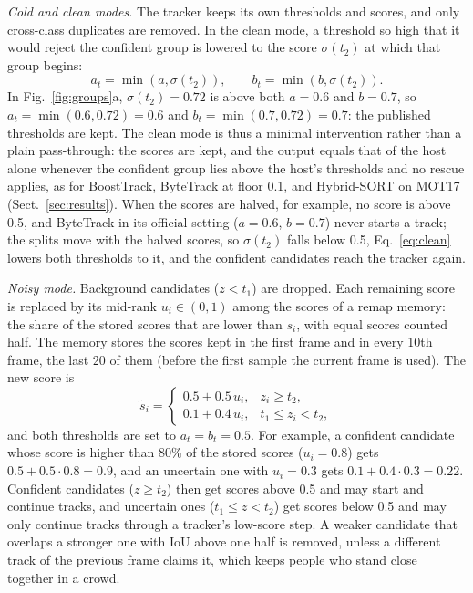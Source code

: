 \emph{Cold and clean modes.} The tracker keeps its own thresholds and scores, and only cross-class
duplicates are removed. In the clean mode, a threshold so high that it would reject the confident
group is lowered to the score $\sigma(t_2)$ at which that group begins:
\begin{equation}
a_t=\min\!\left(a,\sigma(t_2)\right),\qquad b_t=\min\!\left(b,\sigma(t_2)\right).
\label{eq:clean}
\end{equation}
In Fig.~\ref{fig:groups}a, $\sigma(t_2)=0.72$ is above both $a=0.6$ and $b=0.7$, so
$a_t=\min(0.6,0.72)=0.6$ and $b_t=\min(0.7,0.72)=0.7$: the published thresholds are kept. The clean
mode is thus a minimal intervention rather than a plain pass-through: the scores are
kept, and the output equals that of the host alone whenever the confident group lies above the
host's thresholds and no rescue applies, as for BoostTrack, ByteTrack at floor 0.1, and Hybrid-SORT
on MOT17 (Sect.~\ref{sec:results}). When the scores are halved, for example, no score is above 0.5,
and ByteTrack in its official setting ($a=0.6$, $b=0.7$) never starts a track; the splits move with
the halved scores, so $\sigma(t_2)$ falls below 0.5, Eq.~\eqref{eq:clean} lowers both thresholds to
it, and the confident candidates reach the tracker again.

\emph{Noisy mode.} Background candidates ($z<t_1$) are dropped. Each remaining score is
replaced by its mid-rank $u_i\in(0,1)$ among the scores of a remap memory: the share of the stored
scores that are lower than $s_i$, with equal scores counted half. The memory stores the scores
kept in the first frame and in every 10th frame, the last 20 of them (before the first sample the
current frame is used). The new score is
\begin{equation}
\tilde{s}_i=
\begin{cases}
0.5+0.5\,u_i, & z_i\ge t_2,\\
0.1+0.4\,u_i, & t_1\le z_i<t_2,
\end{cases}
\label{eq:remap}
\end{equation}
and both thresholds are set to $a_t=b_t=0.5$. For example, a confident candidate whose score is
higher than 80\% of the stored scores ($u_i=0.8$) gets $0.5+0.5\cdot0.8=0.9$, and an uncertain one
with $u_i=0.3$ gets $0.1+0.4\cdot0.3=0.22$. Confident candidates ($z\ge t_2$) then get scores above 0.5
and may start and continue tracks, and uncertain ones ($t_1\le z<t_2$) get scores below 0.5 and may
only continue tracks through a tracker's low-score step. A weaker
candidate that overlaps a stronger one with IoU above one half is removed, unless a different track
of the previous frame claims it, which keeps people who stand close together in a crowd.

